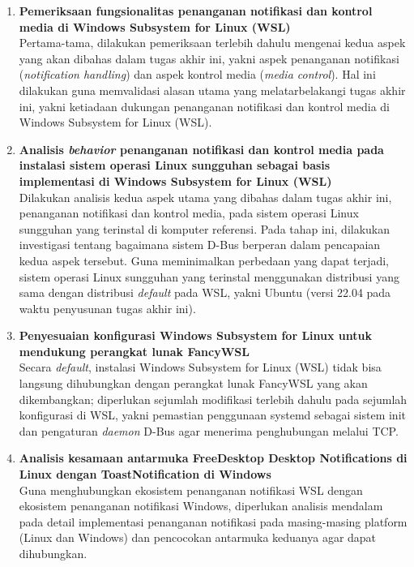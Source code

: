 \begin{enumerate}
    \item \textbf{Pemeriksaan fungsionalitas penanganan notifikasi dan kontrol media di Windows Subsystem for Linux (WSL)}\\
    Pertama-tama, dilakukan pemeriksaan terlebih dahulu mengenai kedua aspek yang akan dibahas dalam tugas akhir ini, yakni aspek penanganan notifikasi (\textit{notification handling}) dan aspek kontrol media (\textit{media control}). Hal ini dilakukan guna memvalidasi alasan utama yang melatarbelakangi tugas akhir ini, yakni ketiadaan dukungan penanganan notifikasi dan kontrol media di Windows Subsystem for Linux (WSL).

    \item \textbf{Analisis \textit{behavior} penanganan notifikasi dan kontrol media pada instalasi sistem operasi Linux sungguhan sebagai basis implementasi di Windows Subsystem for Linux (WSL)}\\
    Dilakukan analisis kedua aspek utama yang dibahas dalam tugas akhir ini, penanganan notifikasi dan kontrol media, pada sistem operasi Linux sungguhan yang terinstal di komputer referensi. Pada tahap ini, dilakukan investigasi tentang bagaimana sistem D-Bus berperan dalam pencapaian kedua aspek tersebut. Guna meminimalkan perbedaan yang dapat terjadi, sistem operasi Linux sungguhan yang terinstal menggunakan distribusi yang sama dengan distribusi \textit{default} pada WSL, yakni Ubuntu (versi 22.04 pada waktu penyusunan tugas akhir ini).

    \item \textbf{Penyesuaian konfigurasi Windows Subsystem for Linux untuk mendukung perangkat lunak FancyWSL}\\
    Secara \textit{default}, instalasi Windows Subsystem for Linux (WSL) tidak bisa langsung dihubungkan dengan perangkat lunak FancyWSL yang akan dikembangkan; diperlukan sejumlah modifikasi terlebih dahulu pada sejumlah konfigurasi di WSL, yakni pemastian penggunaan systemd sebagai sistem init dan pengaturan \textit{daemon} D-Bus agar menerima penghubungan melalui TCP.

    \item \textbf{Analisis kesamaan antarmuka FreeDesktop Desktop Notifications di Linux dengan ToastNotification di Windows}\\
    Guna menghubungkan ekosistem penanganan notifikasi WSL dengan ekosistem penanganan notifikasi Windows, diperlukan analisis mendalam pada detail implementasi penanganan notifikasi pada masing-masing platform (Linux dan Windows) dan pencocokan antarmuka keduanya agar dapat dihubungkan.


\end{enumerate}
